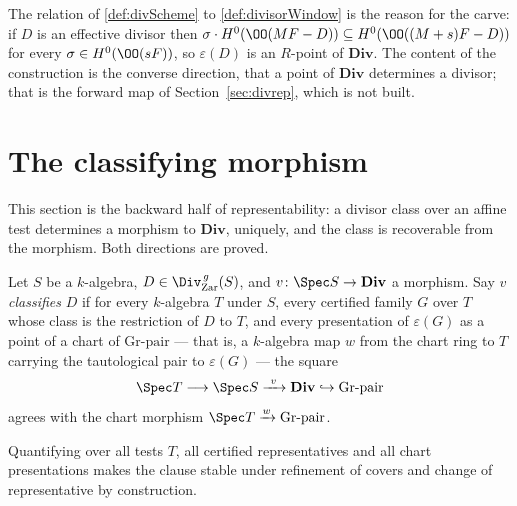 The relation of \ref{def:divScheme} to \ref{def:divisorWindow} is the reason for the carve:
if \(D\) is an effective divisor then \(\sigma \cdot H^0(\OO(MF - D)) \subseteq
H^0(\OO((M+s)F - D))\) for every \(\sigma \in H^0(\OO(sF))\), so \(\varepsilon(D)\) is an
\(R\)-point of \(\mathbf{Div}\). The content of the construction is the converse direction,
that a point of \(\mathbf{Div}\) determines a divisor; that is the forward map of
Section~\ref{sec:divrep}, which is not built.

\section{The classifying morphism}
\label{sec:divclassify}

This section is the backward half of representability: a divisor class over an affine test
determines a morphism to \(\mathbf{Div}\), uniquely, and the class is recoverable from the
morphism. Both directions are proved.

\begin{definition}
  \label{def:isDivRepClassify}
  \leanok
  Let \(S\) be a \(k\)-algebra, \(D \in \Div^{\,g}_{\mathrm{Zar}}(S)\), and \(v \colon \Spec
  S \to \mathbf{Div}\) a morphism. Say \(v\) \emph{classifies} \(D\) if for every
  \(k\)-algebra \(T\) under \(S\), every certified family \(G\) over \(T\) whose class is
  the restriction of \(D\) to \(T\), and every presentation of \(\varepsilon(G)\) as a point
  of a chart of \(\mathrm{Gr}\text{-pair}\) --- that is, a \(k\)-algebra map \(w\) from the
  chart ring to \(T\) carrying the tautological pair to \(\varepsilon(G)\) --- the square
  \[
    \Spec T \longrightarrow \Spec S \xrightarrow{\ v\ } \mathbf{Div}
      \hookrightarrow \mathrm{Gr}\text{-pair}
  \]
  agrees with the chart morphism \(\Spec T \xrightarrow{w} \mathrm{Gr}\text{-pair}\).

  Quantifying over all tests \(T\), all certified representatives and all chart
  presentations makes the clause stable under refinement of covers and change of
  representative by construction.
\end{definition}

